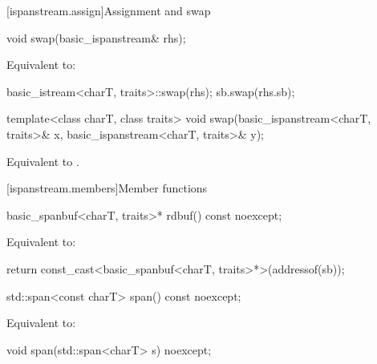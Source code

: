 [ispanstream.assign]{Assignment and swap}

%
\begin{itemdecl}
void swap(basic_ispanstream& rhs);
\end{itemdecl}

\begin{itemdescr}
\pnum
\effects
Equivalent to:
\begin{codeblock}
basic_istream<charT, traits>::swap(rhs);
sb.swap(rhs.sb);
\end{codeblock}
\end{itemdescr}

%
\begin{itemdecl}
template<class charT, class traits>
  void swap(basic_ispanstream<charT, traits>& x, basic_ispanstream<charT, traits>& y);
\end{itemdecl}

\begin{itemdescr}
\pnum
\effects
Equivalent to  .
\end{itemdescr}

[ispanstream.members]{Member functions}

%
\begin{itemdecl}
basic_spanbuf<charT, traits>* rdbuf() const noexcept;
\end{itemdecl}

\begin{itemdescr}
\pnum
\effects
Equivalent to:
\begin{codeblock}
return const_cast<basic_spanbuf<charT, traits>*>(addressof(sb));
\end{codeblock}
\end{itemdescr}

%
\begin{itemdecl}
std::span<const charT> span() const noexcept;
\end{itemdecl}

\begin{itemdescr}
\pnum
\effects
Equivalent to: 
\end{itemdescr}

%
\begin{itemdecl}
void span(std::span<charT> s) noexcept;
\end{itemdecl}

